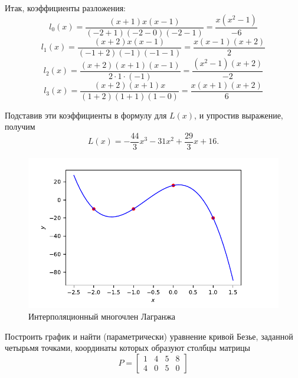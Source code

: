 Итак, коэффициенты разложения:
\begin{equation*}
    l_0(x) = \frac{(x + 1)x(x - 1)}{(-2 + 1)(-2 - 0)(-2 - 1)} =
    \frac{x(x^2 - 1)}{-6}
\end{equation*}
\begin{equation*}
    l_1(x) = \frac{(x + 2)x(x-1)}{(-1 + 2)(-1)(-1 - 1)} =
    \frac{x(x-1)(x+2)}{2}
\end{equation*}
\begin{equation*}
    l_2(x) = \frac{(x + 2)(x + 1)(x - 1)}{2 \cdot 1 \cdot (-1)} =
    \frac{(x^2-1)(x+2)}{-2}
\end{equation*}
\begin{equation*}
    l_3(x) = \frac{(x + 2)(x + 1) x}{(1 + 2)(1 + 1)(1 - 0)} =
    \frac{x(x+1)(x+2)}{6}
\end{equation*}

Подставив эти коэффициенты в формулу для $L(x)$, и упростив выражение, получим
\begin{equation*}
    L(x) = -\frac{44}{3}x^3 - 31x^2 + \frac{29}{3}x + 16.
\end{equation*}

\begin{figure}[hbt]
    \centering
    \includegraphics*[scale=1.0]{./figures/ex3.pdf}
    \caption{Интерполяционный многочлен Лагранжа}
\end{figure}

\newpage
\begin{problem}
    Построить график и найти (параметрически) уравнение кривой Безье, заданной
    четырьмя точками, координаты которых образуют столбцы матрицы
    \begin{equation*}
        P =
        \begin{bmatrix}
            1 & 4 & 5 & 8\\
            4 & 0 & 5 & 0
        \end{bmatrix}
    \end{equation*}
\end{problem}


